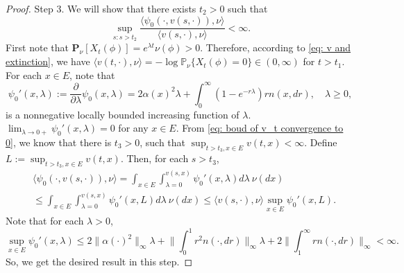 \documentclass[12pt,a4paper]{amsart}
\theoremstyle{plain}
\theoremstyle{definition}
\numberwithin{equation}{section}
\begin{document}
\begin{proof}
	Step 3.
	We will show that there exists $t_2>0$ such that 
\[
	\sup_{s: s>t_2} \frac{\langle \psi_0(\cdot, v(s,\cdot)),\nu\rangle}{ \langle v(s,\cdot), \nu\rangle} <\infty.
\]
	First note that $\mathbf P_\nu[X_t(\phi)] = e^{\lambda t}\nu(\phi)>0$. 
	Therefore, according to \eqref{eq: v and extinction}, we have $\langle v(t,\cdot),\nu\rangle = -\log \mathbb P_\nu\{X_t(\phi) = 0\}\in (0,\infty)$ for $t>t_1$. 
	For each $x\in E$, note that
\[
	\psi_0'(x,\lambda):=\frac{\partial}{\partial \lambda}\psi_0(x,\lambda)
	=2\alpha(x)^2\lambda+\int_0^{\infty}\left(1-e^{-r\lambda}\right)rn(x,dr), 
	\quad \lambda \geq 0,
\]
	is a nonnegative locally bounded increasing function of $\lambda$.
{\color{red}
$\lim_{\lambda\rightarrow 0+}\psi_0'(x,\lambda)=0$ for any $x\in E$.}  
	From \eqref{eq: boud of v_t convergence to 0}, we know that there is $t_3>0$, such that $\sup_{t>t_3,x\in E}v(t,x)<\infty$.
	Define $L:= \sup_{t>t_3,x\in E}v(t,x)$. 
	Then, for each $s>t_3$,
\begin{align}\label{upper bound}
	&\langle\psi_0(\cdot,v(s,\cdot)),\nu\rangle = \int_{x\in E} \int_{\lambda = 0}^{v(s,x)} \psi_0'(x,\lambda)d\lambda~\nu(dx)
	\\&\leq \int_{x\in E} \int_{\lambda = 0}^{v(s,x)} \psi_0'(x,L)d\lambda~\nu(dx)
	\leq \langle v(s,\cdot),\nu\rangle\sup_{x\in E} \psi_0'(x,L).
\end{align}
	Note that for each $\lambda>0$,
\[
	\sup_{x\in E}\psi_0'(x,\lambda)
	\leq 2\|\alpha(\cdot)^2\|_\infty\lambda+\Big\|\int_0^{1}r^2n(\cdot,dr) \Big\|_\infty\lambda+2\Big\|\int_1^{\infty}rn(\cdot,dr)\Big\|_\infty
	<\infty.
\]
	So, we get the desired result in this step.


\end{proof}
\end{document}
